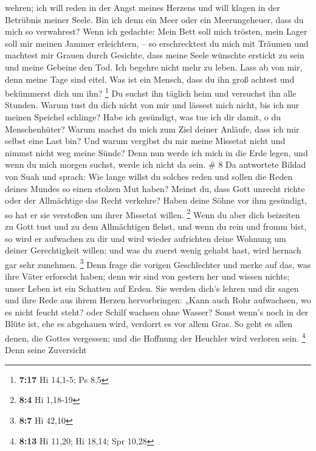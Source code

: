 wehren; ich will reden in der Angst meines Herzens und will klagen in
der Betrübnis meiner Seele.  Bin ich denn ein Meer oder ein
Meerungeheuer, dass du mich so verwahrest?  Wenn ich
gedachte: Mein Bett soll mich trösten, mein Lager soll mir meinen Jammer
erleichtern, --  so erschrecktest du mich mit Träumen und
machtest mir Grauen durch Gesichte,  dass meine Seele
wünschte erstickt zu sein und meine Gebeine den Tod.  Ich
begehre nicht mehr zu leben. Lass ab von mir, denn meine Tage sind
eitel.  Was ist ein Mensch, dass du ihn groß achtest und
bekümmerst dich um ihn? \footnote{\textbf{7:17} Hi 14,1-5; Ps 8,5}
 Du suchst ihn täglich heim und versuchst ihn alle Stunden.
 Warum tust du dich nicht von mir und lässest mich nicht,
bis ich nur meinen Speichel schlinge?  Habe ich gesündigt,
was tue ich dir damit, o du Menschenhüter? Warum machst du mich zum Ziel
deiner Anläufe, dass ich mir selbst eine Last bin?  Und
warum vergibst du mir meine Missetat nicht und nimmst nicht weg meine
Sünde? Denn nun werde ich mich in die Erde legen, und wenn du mich
morgen suchst, werde ich nicht da sein. \# 8  Da antwortete
Bildad von Suah und sprach:  Wie lange willst du solches
reden und sollen die Reden deines Mundes so einen stolzen Mut haben?
 Meinst du, dass Gott unrecht richte oder der Allmächtige
das Recht verkehre?  Haben deine Söhne vor ihm gesündigt, so
hat er sie verstoßen um ihrer Missetat willen. \footnote{\textbf{8:4} Hi
  1,18-19}  Wenn du aber dich beizeiten zu Gott tust und zu
dem Allmächtigen flehst,  und wenn du rein und fromm bist,
so wird er aufwachen zu dir und wird wieder aufrichten deine Wohnung um
deiner Gerechtigkeit willen;  und was du zuerst wenig gehabt
hast, wird hernach gar sehr zunehmen. \footnote{\textbf{8:7} Hi 42,10}
 Denn frage die vorigen Geschlechter und merke auf das, was
ihre Väter erforscht haben;  denn wir sind von gestern her
und wissen nichts; unser Leben ist ein Schatten auf Erden. 
Sie werden dich's lehren und dir sagen und ihre Rede aus ihrem Herzen
hervorbringen:  „Kann auch Rohr aufwachsen, wo es nicht
feucht steht? oder Schilf wachsen ohne Wasser?  Sonst
wenn's noch in der Blüte ist, ehe es abgehauen wird, verdorrt es vor
allem Gras.  So geht es allen denen, die Gottes vergessen;
und die Hoffnung der Heuchler wird verloren sein. \footnote{\textbf{8:13}
  Hi 11,20; Hi 18,14; Spr 10,28}  Denn seine Zuversicht
